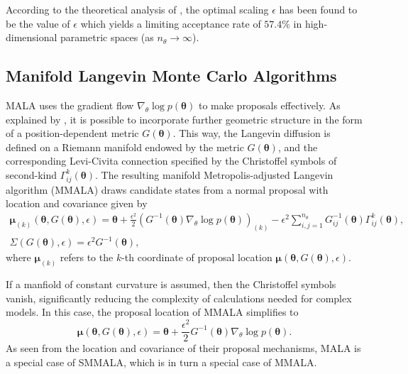 \documentclass[twoside,11pt]{article}
\begin{document}
According to the theoretical analysis of \cite{rob_ros__opt}, the optimal scaling $\epsilon$ has been found to be the value 
of $\epsilon$ which yields a limiting acceptance rate of $57.4\%$ in high-dimensional parametric spaces 
(as $n_{\theta}\rightarrow\infty$).

\subsection{Manifold Langevin Monte Carlo Algorithms}
\label{smmala_section}

MALA uses the gradient flow $\nabla_{\theta}\log{p(\boldsymbol{\theta})}$ to make proposals effectively.
As explained by \cite{gir_cal__rie}, it is possible to incorporate further geometric structure in the form of a 
position-dependent metric $G(\boldsymbol{\theta})$.
This way, the Langevin diffusion is defined on a Riemann manifold endowed by the metric $G(\boldsymbol{\theta})$, and the
corresponding Levi-Civita connection specified by the Christoffel symbols of second-kind 
$\Gamma^{k}_{ij}(\boldsymbol{\theta})$. The resulting manifold Metropolis-adjusted Langevin algorithm (MMALA) draws 
candidate states from a normal proposal with location and covariance given by
\begin{eqnarray}
\label{mmala_location}
\boldsymbol{\mu}_{(k)}(\boldsymbol{\theta}, G(\boldsymbol{\theta}), \epsilon) =
\boldsymbol{\theta}+
\frac{\epsilon^2}{2}(G^{-1}(\boldsymbol{\theta})\nabla_{\theta}\log{p(\boldsymbol{\theta})})_{(k)}-
\epsilon^2\sum_{i,j=1}^{n_\theta}G^{-1}_{ij}(\boldsymbol{\theta})\Gamma^{k}_{ij}(\boldsymbol{\theta}),\\
\label{mmala_covariance}
\Sigma(G(\boldsymbol{\theta}), \epsilon) = \epsilon^2 G^{-1}(\boldsymbol{\theta}),
\end{eqnarray}
where $\boldsymbol{\mu}_{(k)}$ refers to the $k$-th coordinate of proposal location
$\boldsymbol{\mu}(\boldsymbol{\theta}, G(\boldsymbol{\theta}), \epsilon)$.

If a manfiold of constant curvature is assumed, then the Christoffel symbols vanish, significantly reducing the complexity of calculations needed for complex models.  
In this case, the proposal location of MMALA simplifies to
\begin{equation}
\label{smmala_location}
\boldsymbol{\mu}(\boldsymbol{\theta}, G(\boldsymbol{\theta}), \epsilon) =
\boldsymbol{\theta}+
\frac{\epsilon^2}{2}G^{-1}(\boldsymbol{\theta})\nabla_{\theta}\log{p(\boldsymbol{\theta})}.
\end{equation}
As seen from the location and covariance of their proposal mechanisms, MALA is a special case of SMMALA, which is 
in turn a special case of MMALA.
\end{document}

